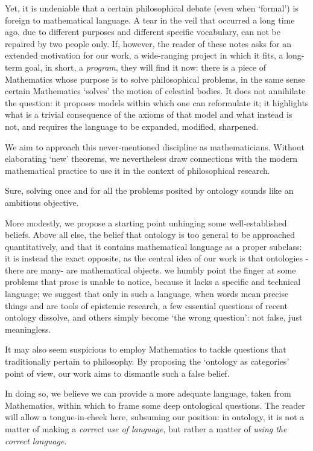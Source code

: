Yet, it is undeniable that a certain philosophical debate (even when `formal') is foreign to mathematical language. A tear in the veil that occurred a long time ago, due to different purposes and different specific vocabulary, can not be repaired by two people only. If, however, the reader of these notes asks for an extended motivation for our work, a wide-ranging project in which it fits, a long-term goal, in short, a \emph{program}, they will find it now: there is a piece of Mathematics whose purpose is to solve philosophical problems, in the same sense certain Mathematics `solves' the motion of celestial bodies. It does not annihilate the question: it proposes models within which one can reformulate it; it highlights what is a trivial consequence of the axioms of that model and what instead is not, and requires the language to be expanded, modified, sharpened. 

We aim to approach this never-mentioned discipline as mathematicians. Without elaborating `new' theorems, we nevertheless draw connections with the modern mathematical practice to use it in the context of philosophical research.

Sure, solving once and for all the problems posited by ontology sounds like an ambitious objective. 

More modestly, we propose a starting point unhinging some well-established beliefs. Above all else, the belief that ontology is too general to be approached quantitatively, and that it contains mathematical language as a proper subclass: it is instead the exact opposite, as the central idea of our work is that ontologies -there are many- are mathematical objects. we humbly point the finger at some problems that prose is unable to notice, because it lacks a specific and technical language; we suggest that only in such a language, when words mean precise things and are tools of epistemic research, a few essential questions of recent ontology dissolve, and others simply become `the wrong question': not false, just meaningless.

It may also seem suspicious to employ Mathematics to tackle questions that traditionally pertain to philosophy. By proposing the `ontology as categories' point of view, our work aims to dismantle such a false belief.%

In doing so, we believe we can provide a more adequate language, taken from Mathematics, within which to frame some deep ontological questions. The reader will allow a tongue-in-cheek here, subsuming our position: in ontology, it is not a matter of making a \emph{correct use of language}, but rather a matter of \emph{using the correct language}.

